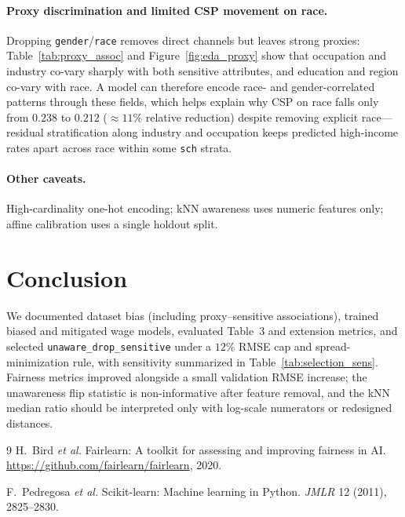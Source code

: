 \documentclass[sigconf,nonacm]{acmart}
\begin{document}
\paragraph{Proxy discrimination and limited CSP movement on race.}
Dropping \texttt{gender}/\texttt{race} removes direct channels but leaves strong proxies: Table~\ref{tab:proxy_assoc} and Figure~\ref{fig:eda_proxy} show that occupation and industry co-vary sharply with both sensitive attributes, and education and region co-vary with race.
A model can therefore encode race- and gender-correlated patterns through these fields, which helps explain why CSP on race falls only from $0.238$ to $0.212$ ($\approx 11\%$ relative reduction) despite removing explicit race---residual stratification along industry and occupation keeps predicted high-income rates apart across race within some \texttt{sch} strata.

\paragraph{Other caveats.}
High-cardinality one-hot encoding; kNN awareness uses numeric features only; affine calibration uses a single holdout split.

\section{Conclusion}

We documented dataset bias (including proxy--sensitive associations), trained biased and mitigated wage models, evaluated Table~3 and extension metrics, and selected \texttt{unaware\_drop\_sensitive} under a $12\%$ RMSE cap and spread-minimization rule, with sensitivity summarized in Table~\ref{tab:selection_sens}.
Fairness metrics improved alongside a small validation RMSE increase; the unawareness flip statistic is non-informative after feature removal, and the kNN median ratio should be interpreted only with log-scale numerators or redesigned distances.

\begin{thebibliography}{9}
H.~Bird \emph{et al.}
\newblock Fairlearn: A toolkit for assessing and improving fairness in AI.
\newblock \url{https://github.com/fairlearn/fairlearn}, 2020.

F.~Pedregosa \emph{et al.}
\newblock Scikit-learn: Machine learning in Python.
\newblock \textit{JMLR} 12 (2011), 2825--2830.
\end{thebibliography}
\end{document}
